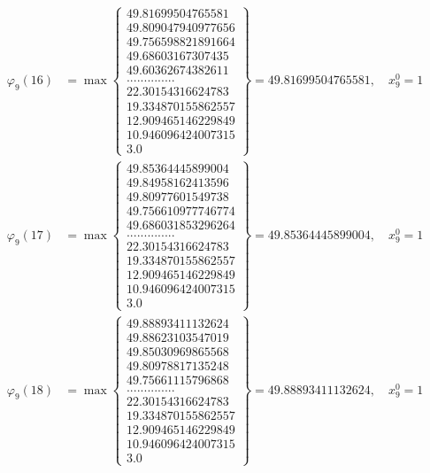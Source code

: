 \documentclass{article}
\begin{document}
\begin{align*}
  
  
  
\varphi_{9}(16) &= \max \left\{ \begin{array}{c}
49.81699504765581 \\
 49.809047940977656 \\
 49.756598821891664 \\
 49.68603167307435 \\
 49.60362674382611 \\
 .............. \\
 22.30154316624783 \\
 19.334870155862557 \\
 12.909465146229849 \\
 10.946096424007315 \\
 3.0
\end{array} \right\} = 49.81699504765581, \quad x_{9}^0 = 1\\
  
  
  
  
\varphi_{9}(17) &= \max \left\{ \begin{array}{c}
49.85364445899004 \\
 49.84958162413596 \\
 49.80977601549738 \\
 49.756610977746774 \\
 49.686031853296264 \\
 .............. \\
 22.30154316624783 \\
 19.334870155862557 \\
 12.909465146229849 \\
 10.946096424007315 \\
 3.0
\end{array} \right\} = 49.85364445899004, \quad x_{9}^0 = 1\\
  
  
  
  
\varphi_{9}(18) &= \max \left\{ \begin{array}{c}
49.88893411132624 \\
 49.88623103547019 \\
 49.85030969865568 \\
 49.80978817135248 \\
 49.75661115796868 \\
 .............. \\
 22.30154316624783 \\
 19.334870155862557 \\
 12.909465146229849 \\
 10.946096424007315 \\
 3.0
\end{array} \right\} = 49.88893411132624, \quad x_{9}^0 = 1\\
  

\end{align*}
\end{document}
